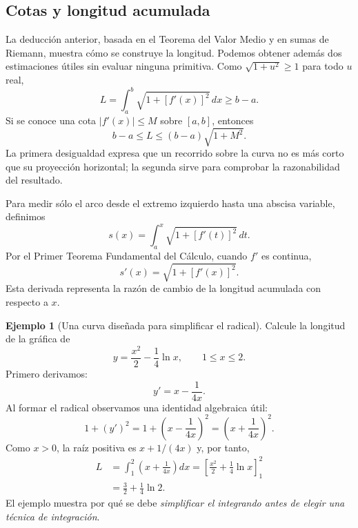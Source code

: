 \documentclass[12pt]{article}
\theoremstyle{definition}
\newtheorem{ejemplo}[teorema]{Ejemplo}
\theoremstyle{remark}
\begin{document}

\subsection*{Cotas y longitud acumulada}
La deducción anterior, basada en el Teorema del Valor Medio y en sumas de Riemann, muestra cómo se construye la longitud. Podemos obtener además dos estimaciones útiles sin evaluar ninguna primitiva. Como $\sqrt{1+u^2}\ge1$ para todo $u$ real,
\[
L=\int_a^b\sqrt{1+[f'(x)]^2}\,dx\ge b-a.
\]
Si se conoce una cota $|f'(x)|\le M$ sobre $[a,b]$, entonces
\[
\boxed{b-a\le L\le(b-a)\sqrt{1+M^2}.}
\]
La primera desigualdad expresa que un recorrido sobre la curva no es más corto que su proyección horizontal; la segunda sirve para comprobar la razonabilidad del resultado.

Para medir sólo el arco desde el extremo izquierdo hasta una abscisa variable, definimos
\[
s(x)=\int_a^x\sqrt{1+[f'(t)]^2}\,dt.
\]
Por el Primer Teorema Fundamental del Cálculo, cuando $f'$ es continua,
\[
\boxed{s'(x)=\sqrt{1+[f'(x)]^2}.}
\]
Esta derivada representa la razón de cambio de la longitud acumulada con respecto a $x$.

\begin{ejemplo}[Una curva diseñada para simplificar el radical]
Calcule la longitud de la gráfica de
\[
y=\frac{x^2}{2}-\frac14\ln x,
\qquad 1\le x\le2.
\]
Primero derivamos:
\[
y'=x-\frac{1}{4x}.
\]
Al formar el radical observamos una identidad algebraica útil:
\[
1+(y')^2
=1+\left(x-\frac1{4x}\right)^2
=\left(x+\frac1{4x}\right)^2.
\]
Como $x>0$, la raíz positiva es $x+1/(4x)$ y, por tanto,
\begin{align*}
L&=\int_1^2\left(x+\frac1{4x}\right)dx
=\left[\frac{x^2}{2}+\frac14\ln x\right]_1^2\\
&=\boxed{\frac32+\frac14\ln2}.
\end{align*}
El ejemplo muestra por qué se debe \emph{simplificar el integrando antes de elegir una técnica de integración}.
\end{ejemplo}

\end{document}
